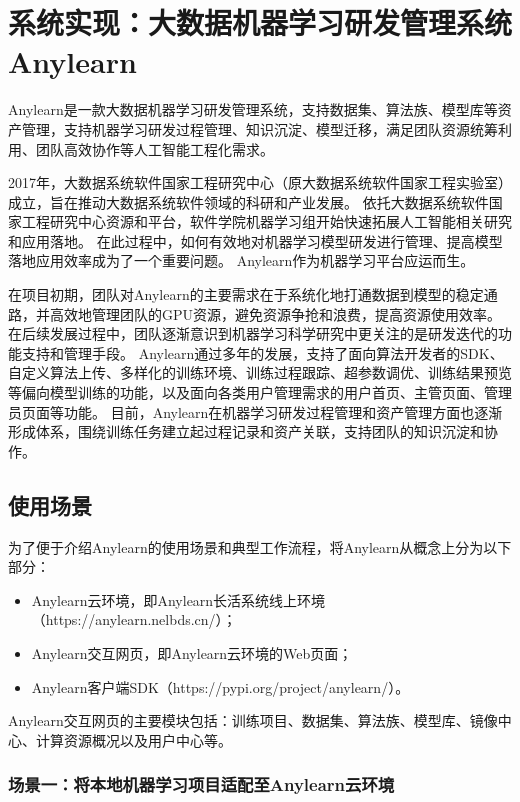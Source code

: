 
\chapter{系统实现：大数据机器学习研发管理系统Anylearn}

Anylearn是一款大数据机器学习研发管理系统，支持数据集、算法族、模型库等资产管理，支持机器学习研发过程管理、知识沉淀、模型迁移，满足团队资源统筹利用、团队高效协作等人工智能工程化需求。

2017年，大数据系统软件国家工程研究中心（原大数据系统软件国家工程实验室）成立，旨在推动大数据系统软件领域的科研和产业发展。
依托大数据系统软件国家工程研究中心资源和平台，软件学院机器学习组开始快速拓展人工智能相关研究和应用落地。
在此过程中，如何有效地对机器学习模型研发进行管理、提高模型落地应用效率成为了一个重要问题。
Anylearn作为机器学习平台应运而生。

在项目初期，团队对Anylearn的主要需求在于系统化地打通数据到模型的稳定通路，并高效地管理团队的GPU资源，避免资源争抢和浪费，提高资源使用效率。
在后续发展过程中，团队逐渐意识到机器学习科学研究中更关注的是研发迭代的功能支持和管理手段。
Anylearn通过多年的发展，支持了面向算法开发者的SDK、自定义算法上传、多样化的训练环境、训练过程跟踪、超参数调优、训练结果预览等偏向模型训练的功能，以及面向各类用户管理需求的用户首页、主管页面、管理员页面等功能。
目前，Anylearn在机器学习研发过程管理和资产管理方面也逐渐形成体系，围绕训练任务建立起过程记录和资产关联，支持团队的知识沉淀和协作。

\section{使用场景}

为了便于介绍Anylearn的使用场景和典型工作流程，将Anylearn从概念上分为以下部分：
\begin{itemize}
  \item Anylearn云环境，即Anylearn长活系统线上环境（https://anylearn.nelbds.cn/）；
  \item Anylearn交互网页，即Anylearn云环境的Web页面；
  \item Anylearn客户端SDK（https://pypi.org/project/anylearn/）。
\end{itemize}

Anylearn交互网页的主要模块包括：训练项目、数据集、算法族、模型库、镜像中心、计算资源概况以及用户中心等。

\subsection{场景一：将本地机器学习项目适配至Anylearn云环境}


